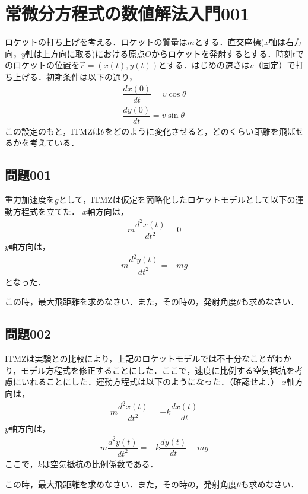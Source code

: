 \documentclass[12pt]{jarticle}
\date{}
\begin{document}

\section*{常微分方程式の数値解法入門001}
ロケットの打ち上げを考える．ロケットの質量は$m$とする．直交座標($x$軸は右方向，$y$軸は上方向に取る)における原点$O$からロケットを発射するとする．時刻$t$でのロケットの位置を$\vec{r} = (x(t), y(t))$とする．はじめの速さは$v$（固定）で打ち上げる．初期条件は以下の通り，
%
\begin{align*}
\dfrac{dx(0)}{dt} = v \cos \theta \\
\dfrac{dy(0)}{dt} = v \sin \theta
\end{align*}
%
この設定のもと，ITMZは$\theta$をどのように変化させると，どのくらい距離を飛ばせるかを考えている．
%
\subsection*{問題001}
重力加速度を$g$として，ITMZは仮定を簡略化したロケットモデルとして以下の運動方程式を立てた．
$x$軸方向は，
\begin{align*}
m \dfrac{d^2 x(t)}{dt^2} = 0
\end{align*}
$y$軸方向は，
\begin{align*}
m \dfrac{d^2 y(t)}{dt^2} = -mg
\end{align*}
となった．

この時，最大飛距離を求めなさい．また，その時の，発射角度$\theta$も求めなさい．
%
\subsection*{問題002}
ITMZは実験との比較により，上記のロケットモデルでは不十分なことがわかり，モデル方程式を修正することにした．ここで，速度に比例する空気抵抗を考慮にいれることにした．運動方程式は以下のようになった．（確認せよ．）
$x$軸方向は，
\begin{align*}
m \dfrac{d^2 x(t)}{dt^2} = - k \dfrac{dx(t)}{dt}
\end{align*}
$y$軸方向は，
\begin{align*}
m \dfrac{d^2 y(t)}{dt^2} = - k \dfrac{dy(t)}{dt} -mg
\end{align*}
ここで，$k$は空気抵抗の比例係数である．

この時，最大飛距離を求めなさい．また，その時の，発射角度$\theta$も求めなさい．
%
\end{document}
